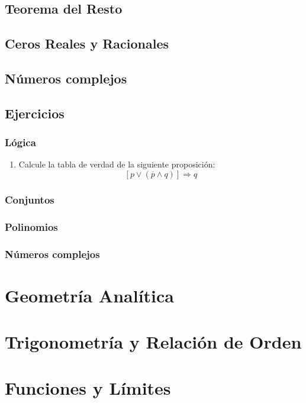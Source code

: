 \documentclass[11pt, twoside]{book}
\begin{document}
\section{Teorema del Resto}
\section{Ceros Reales y Racionales}

\section{Números complejos}


\newpage
\section{Ejercicios}
\subsection*{Lógica}
\begin{enumerate}
    \item Calcule la tabla de verdad de la siguiente proposición:
            \[\left[p\vee(\overline{p}\wedge q)\right]\Rightarrow q\]
\end{enumerate}
\subsection*{Conjuntos}
\subsection*{Polinomios}
\subsection*{Números complejos}


\chapter{Geometría Analítica}

\chapter{Trigonometría y Relación de Orden}

\chapter{Funciones y Límites}



\printindex

\begin{titlepage}

    \makebox[0pt][l]{\rule{1.3\textwidth}{0pt}}
    \par
    \pagecolor{ustmidgreen}

    \noindent
\end{titlepage}

\nopagecolor
\end{document}
